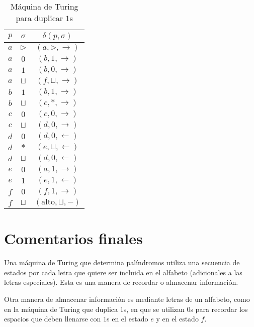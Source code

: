 \documentclass[paper=leter, fontsize=11pt]{scrartcl}
\numberwithin{equation}{section}		%
\numberwithin{figure}{section}			%
\numberwithin{table}{section}				%
\begin{document}
\begin{table}[]
	\caption{Máquina de Turing para duplicar $1$s}
	\label{duplicar}
	\centering
	\begin{tabular}{cc|c}
	$p$ & $\sigma$ & $\delta(p, \sigma)$ \\ \hline

	$a$ & $\triangleright$ & $(a, \triangleright, \rightarrow)$ \\
	$a$ & $0$ & $(b, 1, \rightarrow)$ \\
	$a$ & $1$ & $(b, 0, \rightarrow)$ \\
	$a$ & $\sqcup$ & $(f, \sqcup, \rightarrow)$ \\
	$b$ & $1$ & $(b, 1, \rightarrow)$ \\
	$b$ & $\sqcup$ & $(c, *, \rightarrow)$ \\
	$c$ & $0$ & $(c, 0, \rightarrow)$ \\
	$c$ & $\sqcup$ & $(d, 0, \rightarrow)$ \\
	$d$ & $0$ & $(d, 0, \leftarrow)$ \\
	$d$ & $*$ & $(e, \sqcup, \leftarrow)$ \\
	$d$ & $\sqcup$ & $(d, 0, \leftarrow)$ \\
	$e$ & $0$ & $(a, 1, \rightarrow)$ \\
	$e$ & $1$ & $(e, 1, \leftarrow)$ \\
	$f$ & $0$ & $(f, 1, \rightarrow)$ \\
	$f$ & $\sqcup$ & $(\text{alto}, \sqcup, -)$
	\end{tabular}
\end{table}

\section{Comentarios finales}

Una máquina de Turing que determina palíndromos utiliza una secuencia de estados por cada letra que quiere ser incluida en el alfabeto (adicionales a las letras especiales). Esta es una manera de recordar o almacenar información. 

Otra manera de almacenar información es mediante letras de un alfabeto, como en la máquina de Turing que duplica $1$s, en que se utilizan $0$s para recordar los espacios que deben llenarse con $1$s en el estado $e$ y en el estado $f$.



\end{document}

